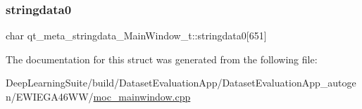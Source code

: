\subsubsection{\texorpdfstring{stringdata0}{stringdata0}}
{\footnotesize\ttfamily char qt\+\_\+meta\+\_\+stringdata\+\_\+\+Main\+Window\+\_\+t\+::stringdata0\mbox{[}651\mbox{]}}



The documentation for this struct was generated from the following file\+:\begin{DoxyCompactItemize}
\item 
Deep\+Learning\+Suite/build/\+Dataset\+Evaluation\+App/\+Dataset\+Evaluation\+App\+\_\+autogen/\+E\+W\+I\+E\+G\+A46\+W\+W/\hyperlink{moc__mainwindow_8cpp}{moc\+\_\+mainwindow.\+cpp}\end{DoxyCompactItemize}
